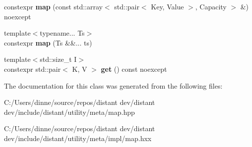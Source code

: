 \begin{DoxyCompactItemize}
\item 
\mbox{\label{classdistant_1_1utility_1_1meta_1_1map_a76ee9e133058142929cf9155b8c533e1}} 
constexpr {\bfseries map} (const std\+::array$<$ std\+::pair$<$ Key, Value $>$, Capacity $>$ \&) noexcept
\item 
\mbox{\label{classdistant_1_1utility_1_1meta_1_1map_aa9c890b96f8eef089b2c55c6d5da3d7e}} 
{\footnotesize template$<$typename... Ts$>$ }\\constexpr {\bfseries map} (Ts \&\&... ts)
\item 
\mbox{\label{classdistant_1_1utility_1_1meta_1_1map_a4d6583657d943845c87ab2c2591b06e5}} 
{\footnotesize template$<$std\+::size\+\_\+t I$>$ }\\constexpr std\+::pair$<$ K, V $>$ {\bfseries get} () const noexcept
\end{DoxyCompactItemize}


The documentation for this class was generated from the following files\+:\begin{DoxyCompactItemize}
\item 
C\+:/\+Users/dinne/source/repos/distant dev/distant dev/include/distant/utility/meta/map.\+hpp\item 
C\+:/\+Users/dinne/source/repos/distant dev/distant dev/include/distant/utility/meta/impl/map.\+hxx\end{DoxyCompactItemize}
